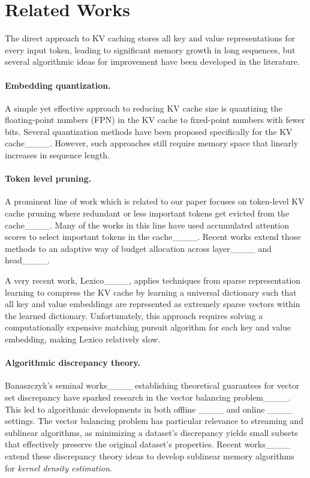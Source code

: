 \section{Related Works}
\label{sec:related_works}
The direct approach to KV caching stores all key and value representations for every input token, leading to significant memory growth in long sequences, but several algorithmic ideas for improvement have been developed in the literature.

\paragraph{Embedding quantization.} A simple yet effective approach to reducing KV cache size is quantizing the floating-point numbers (FPN) in the KV cache to fixed-point numbers with fewer bits. 
Several quantization methods have been proposed specifically for the KV cache____.
However, such approaches still require memory space that linearly increases in sequence length. 

\paragraph{Token level pruning.} A prominent line of work which is related to our paper focuses on token-level KV cache  pruning where redundant or less important tokens get evicted from the cache____.
Many of the works in this line have used accumulated attention scores to select important tokens in the cache____. 
Recent works extend those methods to an adaptive way of budget allocation across layer____ and head____.


A very recent work, Lexico____, applies techniques from sparse representation learning to compress the KV cache by learning a universal dictionary such that all key and value embeddings are represented as extremely sparse vectors within the learned dictionary. 
Unfortunately, this approach requires solving a computationally expensive matching pursuit algorithm for each key and value embedding, making Lexico relatively slow.

\paragraph{Algorithmic discrepancy theory.}
Banaszczyk's seminal works____ establishing theoretical guarantees for vector set discrepancy have sparked research in the vector balancing problem____. This led to algorithmic developments in both offline ____ and online ____ settings. The vector balancing problem has particular relevance to streaming and sublinear algorithms, as minimizing a dataset's discrepancy yields small subsets that effectively preserve the original dataset's properties. Recent works____ extend these discrepancy theory ideas to develop sublinear memory algorithms for \emph{kernel density estimation}.